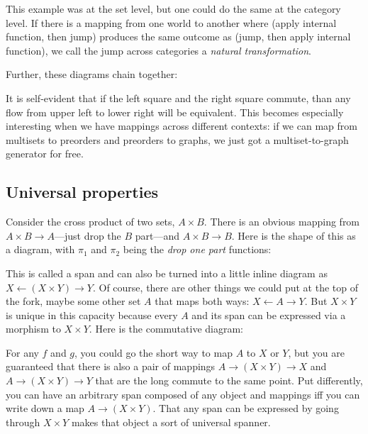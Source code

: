 \documentclass[11pt]{article}
\begin{document}
This example was at the set level, but one could do the same at the category level.
If there is a mapping from one world to another where (apply internal function, then jump)
produces the same outcome as (jump, then apply internal function), we call the jump across
categories a {\em natural transformation}.

Further, these diagrams chain together:


It is self-evident that if the left square and the right square commute, than any flow
from upper left to lower right will be equivalent. This becomes especially interesting
when we have mappings across different contexts: if we can map from multisets to preorders
and preorders to graphs, we just got a multiset-to-graph generator for free.

\subsection{Universal properties}
Consider the cross product of two sets, $A\times B$. There is an obvious mapping from
$A\times B \to A$---just drop the $B$ part---and $A\times B \to B$. Here is the shape of this as a
diagram, with $\pi_1$ and $\pi_2$ being the {\em drop one part} functions:


This is called a span and can also be turned into a little inline diagram as
$X \leftarrow (X\times Y) \rightarrow Y$.
Of course, there are other things we could put at the top of the fork, maybe some other
set $A$ that maps both ways: $X \leftarrow A \rightarrow Y$.
But $X\times Y$ is unique in this capacity because every $A$ and its span can be expressed
via a morphism to $X\times Y$. Here is the commutative diagram:


For any $f$ and $g$, you could go the short way to map $A$ to $X$ or $Y$, but you are
guaranteed that there is also a pair of mappings $A\to (X\times Y) \to X$ and $A\to
(X\times Y) \to Y$ that are
the long commute to the same point.  Put differently, you can have an arbitrary
span composed of any object and mappings iff you can write down a map $A\to (X\times
Y)$. That any span can be expressed by going through $X\times Y$ makes that object a
sort of universal spanner.
\end{document}

